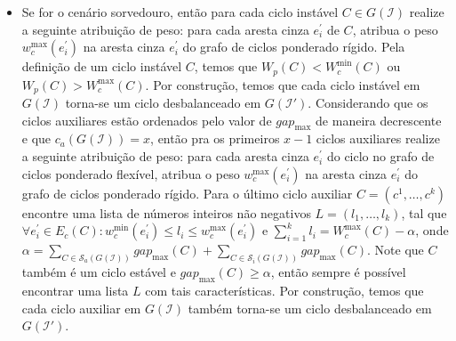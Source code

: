\begin{itemize}
\begin{itemize}
    \item Se for o cenário sorvedouro, então para cada ciclo instável $C \in G(\mathcal{I})$ realize a seguinte atribuição de peso: para cada aresta cinza $e^{\prime}_i$ de $C$, atribua o peso $w^{\max}_c(e^{\prime}_i)$ na aresta cinza $e^{\prime}_i$ do grafo de ciclos ponderado rígido. Pela definição de um ciclo instável $C$, temos que $W_p(C)  < W^{\min}_c(C)$ ou $W_p(C) > W^{\max}_c(C)$. Por construção, temos que cada ciclo instável em $G(\mathcal{I})$ torna-se um ciclo desbalanceado em $G(\mathcal{I}')$. Considerando que os ciclos auxiliares estão ordenados pelo valor de $gap_{\max}$ de maneira decrescente e que $c_a(G(\mathcal{I})) = x$, então pra os primeiros $x-1$ ciclos auxiliares realize a seguinte atribuição de peso: para cada aresta cinza $e^{\prime}_i$ do ciclo no grafo de ciclos ponderado flexível, atribua o peso $w^{\max}_c(e^{\prime}_i)$ na aresta cinza $e^{\prime}_i$ do grafo de ciclos ponderado rígido. Para o último ciclo auxiliar $C=(c^1,\dots,c^k)$ encontre uma lista de números inteiros não negativos $L=(l_1,\dots,l_k)$, tal que $\forall e^{\prime}_i \in E_c(C): w^{\min}_c(e^{\prime}_i) \le l_i \le w^{\max}_c(e^{\prime}_i)$ e $\sum_{i=1}^{k}l_i = W^{\max}_c(C) - \alpha$, onde $\alpha = \sum_{C \in \mathcal{S}_a(G(\mathcal{I}))} gap_{\max}(C) + \sum_{C \in \mathcal{S}_i(G(\mathcal{I}))} gap_{\max}(C)$. Note que $C$ também é um ciclo estável e $gap_{\max}(C) \ge \alpha$, então sempre é possível encontrar uma lista $L$ com tais características. Por construção, temos que cada ciclo auxiliar em $G(\mathcal{I})$ também torna-se um ciclo desbalanceado em $G(\mathcal{I}')$.


\end{itemize}
\end{itemize}

